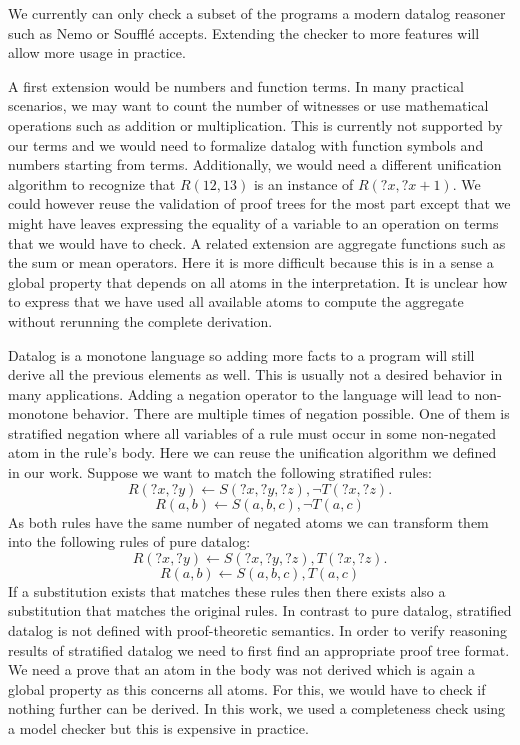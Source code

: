We currently can only check a subset of the programs a modern datalog reasoner such as Nemo or Soufflé accepts. Extending the checker to more features will allow more usage in practice. 

A first extension would be numbers and function terms. In many practical scenarios, we may want to count the number of witnesses or use mathematical operations such as addition or multiplication. This is currently not supported by our terms and we would need to formalize datalog with function symbols and numbers starting from terms. Additionally, we would need a different unification algorithm to recognize that $R(12, 13)$ is an instance of $R(?x, ?x + 1)$. We could however reuse the validation of proof trees for the most part except that we might have leaves expressing the equality of a variable to an operation on terms that we would have to check. A related extension are aggregate functions such as the sum or mean operators. Here it is more difficult because this is in a sense a global property that depends on all atoms in the interpretation. It is unclear how to express that we have used all available atoms to compute the aggregate without rerunning the complete derivation.


Datalog is a monotone language so adding more facts to a program will still derive all the previous elements as well. This is usually not a desired behavior in many applications. Adding a negation operator to the language will lead to non-monotone behavior. There are multiple times of negation possible. One of them is stratified negation where all variables of a rule must occur in some non-negated atom in the rule's body. Here we can reuse the unification algorithm we defined in our work. Suppose we want to match the following stratified rules: 
    \[ R(?x,?y) \leftarrow S(?x, ?y, ?z), \neg T(?x, ?z). \]
    \[ R(a,b) \leftarrow S(a, b, c), \neg T(a, c) \]
As both rules have the same number of negated atoms we can transform them into the following rules of pure datalog:
    \[ R(?x,?y) \leftarrow S(?x, ?y, ?z), T(?x, ?z). \]
    \[ R(a,b) \leftarrow S(a, b, c), T(a, c) \]
If a substitution exists that matches these rules then there exists also a substitution that matches the original rules. In contrast to pure datalog, stratified datalog is not defined with proof-theoretic semantics\cite{alice}. In order to verify reasoning results of stratified datalog we need to first find an appropriate proof tree format. We need a prove that an atom in the body was not derived which is again a global property as this concerns all atoms. For this, we would have to check if nothing further can be derived. In this work, we used a completeness check using a model checker but this is expensive in practice. 

